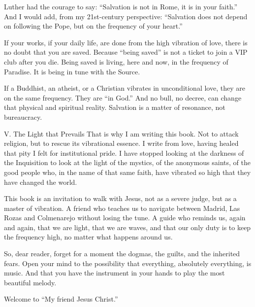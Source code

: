 Luther had the courage to say: ``Salvation is not in Rome, it is in your faith.'' And I would add, from my 21st-century perspective: ``Salvation does not depend on following the Pope, but on the frequency of your heart.''


If your works, if your daily life, are done from the high vibration of love, there is no doubt that you are saved. Because ``being saved'' is not a ticket to join a VIP club after you die. Being saved is living, here and now, in the frequency of Paradise. It is being in tune with the Source.


If a Buddhist, an atheist, or a Christian vibrates in unconditional love, they are on the same frequency. They are ``in God.'' And no bull, no decree, can change that physical and spiritual reality. Salvation is a matter of resonance, not bureaucracy.


V. The Light that Prevails
That is why I am writing this book. Not to attack religion, but to rescue its vibrational essence. I write from love, having healed that pity I felt for institutional pride. I have stopped looking at the darkness of the Inquisition to look at the light of the mystics, of the anonymous saints, of the good people who, in the name of that same faith, have vibrated so high that they have changed the world.


This book is an invitation to walk with Jesus, not as a severe judge, but as a master of vibration. A friend who teaches us to navigate between Madrid, Las Rozas and Colmenarejo without losing the tune. A guide who reminds us, again and again, that we are light, that we are waves, and that our only duty is to keep the frequency high, no matter what happens around us.


So, dear reader, forget for a moment the dogmas, the guilts, and the inherited fears. Open your mind to the possibility that everything, absolutely everything, is music. And that you have the instrument in your hands to play the most beautiful melody.


Welcome to ``My friend Jesus Christ.''